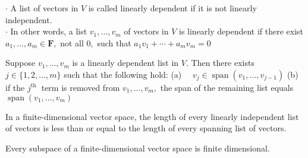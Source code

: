 $\cdot$ A list of vectors in $V$ is called linearly dependent if it is not linearly independent. \\
$\cdot$ In other words, a list $v_{1}, \ldots, v_{m}$ of vectors in $V$ is linearly dependent if there exist $a_{1}, \ldots, a_{m} \in \mathbf{F},$ not all $0,$ such that $a_{1} v_{1}+\cdots+a_{m} v_{m}=0$

Suppose $v_{1}, \ldots, v_{m}$ is a linearly dependent list in $V .$ Then there exists $j \in\{1,2, \ldots, m\}$ such that the following hold:
(a) $\quad v_{j} \in \operatorname{span}\left(v_{1}, \ldots, v_{j-1}\right)$
(b) if the $j^{\text {th }}$ term is removed from $v_{1}, \ldots, v_{m},$ the span of the remaining list equals $\operatorname{span}\left(v_{1}, \ldots, v_{m}\right)$

In a finite-dimensional vector space, the length of every linearly independent list of vectors is less than or equal to the length of every spanning list of vectors.

Every subspace of a finite-dimensional vector space is finite dimensional. 
